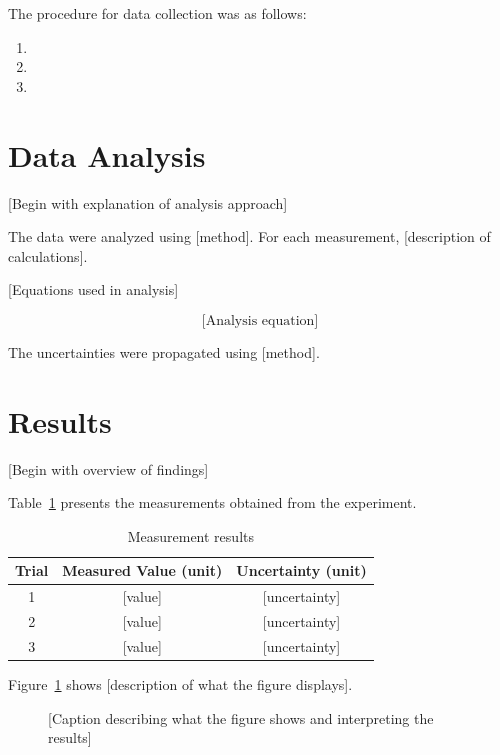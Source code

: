 \documentclass[12pt,a4paper]{article}
\begin{document}
The procedure for data collection was as follows:
\begin{enumerate}
    \item [Step 1]
    \item [Step 2]
    \item [Step 3]
\end{enumerate}

\section{Data Analysis}
\label{sec:analysis}

[Begin with explanation of analysis approach]

The data were analyzed using [method]. For each measurement, [description of calculations].

[Equations used in analysis]

$$
\text{[Analysis equation]}
$$

The uncertainties were propagated using [method].

\section{Results}
\label{sec:results}

[Begin with overview of findings]

Table~\ref{tab:results} presents the measurements obtained from the experiment.

\begin{table}[h]
\centering
\caption{Measurement results}
\label{tab:results}
\begin{tabular}{ccc}
\toprule
Trial & Measured Value (unit) & Uncertainty (unit) \\
\midrule
1 & [value] & [uncertainty] \\
2 & [value] & [uncertainty] \\
3 & [value] & [uncertainty] \\
\bottomrule
\end{tabular}
\end{table}

Figure~\ref{fig:results} shows [description of what the figure displays].

\begin{figure}[h]
\centering
\caption{[Caption describing what the figure shows and interpreting the results]}
\label{fig:results}
\end{figure}
\end{document}
